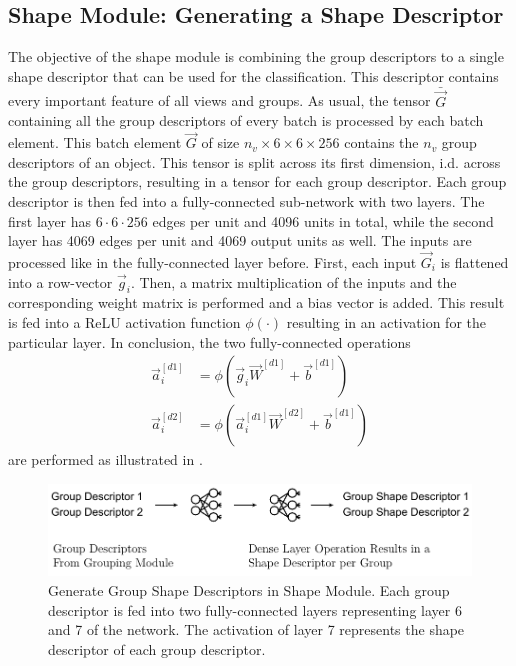 \subsection{Shape Module: Generating a Shape Descriptor}
\label{sec:architecture-shape-module}
The objective of the shape module is combining the group descriptors to a single shape descriptor that can be used for the classification.
This descriptor contains every important feature of all views and groups.
As usual, the tensor $\bar{\vec{G}}$ containing all the group descriptors of every batch is processed by each batch element.
This batch element $\vec{G}$ of size $n_v \times 6 \times 6 \times 256$ contains the $n_v$ group descriptors of an object.
This tensor is split across its first dimension, i.d. across the group descriptors, resulting in a tensor for each group descriptor.
Each group descriptor is then fed into a fully-connected sub-network with two layers.
The first layer has $6\cdot6\cdot256$ edges per unit and 4096 units in total, while the second layer has 4069 edges per unit and 4069 output units as well.
The inputs are processed like in the fully-connected layer before.
First, each input $\vec{G}_i$ is flattened into a row-vector $\vec{g}_i$.
Then, a matrix multiplication of the inputs and the corresponding weight matrix is performed and a bias vector is added.
This result is fed into a ReLU activation function $\phi(\cdot)$ resulting in an activation for the particular layer.
In conclusion, the two fully-connected operations
\begin{subequations}
	\begin{align}
		\vec{a}^{[d1]}_i &= \phi(\vec{g}_i \vec{W}^{[d1]} + \vec{b}^{[d1]}) \\
		\vec{a}^{[d2]}_i &= \phi(\vec{a}^{[d1]}_i \vec{W}^{[d2]} + \vec{b}^{[d1]})
	\end{align}
\end{subequations}
are performed as illustrated in .
\begin{figure}
	\centering
	\includegraphics[]{images/shape_module_group_shape.pdf}
	\caption[Generate Group Shape Descriptors in Shape Module]{Generate Group Shape Descriptors in Shape Module. Each group descriptor is fed into two fully-connected layers representing layer 6 and 7 of the network. The activation of layer 7 represents the shape descriptor of each group descriptor.}
	\label{fig:shape-module-group-shape}
\end{figure}
